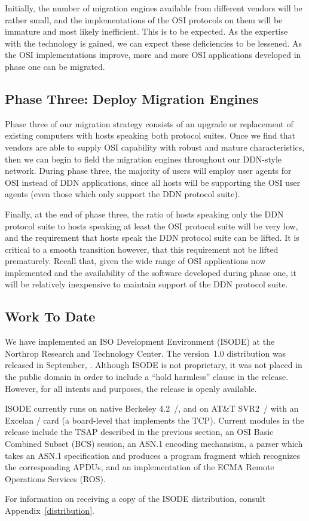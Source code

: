 Initially,
the number of migration engines available from different vendors
will be rather small, and the implementations of the OSI protocols on them
will be immature and most likely inefficient.
This is to be expected.
As the expertise with the technology is gained,
we can expect these deficiencies to be lessened.
As the OSI implementations improve,
more and more OSI applications developed in phase one can be migrated.

\subsection	{Phase Three: Deploy Migration Engines}
Phase three of our migration strategy consists of an upgrade or replacement
of existing computers with hosts speaking both protocol suites.
Once we find that vendors are able to supply OSI capability with robust and
mature characteristics,
then we can begin to field the migration engines throughout our DDN-style
network.
During phase three,
the majority of users will employ user agents for OSI instead of DDN
applications,
since all hosts will be supporting the OSI user agents
(even those which only support the DDN protocol suite).

Finally,
at the end of phase three,
the ratio of hosts speaking only the DDN protocol suite to hosts speaking at
least the OSI protocol suite will be very low,
and the requirement that hosts speak the DDN protocol suite can be lifted.
It is critical to a smooth transition however,
that this requirement not be lifted prematurely.
Recall that,
given the wide range of OSI applications now implemented
and the availability of the software developed during phase one,
it will be relatively inexpensive to maintain support of the DDN protocol
suite.

\subsection	{Work To Date}
We have implemented an ISO Development Environment (ISODE) at the Northrop
Research and Technology Center.
The version~1.0 distribution was released in September, {}.
Although ISODE is not proprietary,
it was not placed in the public domain in order to include a ``hold
harmless'' clause in the release.
However, for all intents and purposes, the release is openly available.

ISODE currently runs on native Berkeley 4.2~\unix/,
and on AT\&T SVR2~\unix/ with an Excelan \exos/ card
(a board-level that implements the TCP).
Current modules in the release include the TSAP described in the previous
section, an OSI Basic Combined Subset (BCS) session,
an ASN.1 encoding mechansism,
a parser which takes an ASN.1 specification and produces a program fragment
which recognizes the corresponding APDUs,
and an implementation of the ECMA Remote Operations Services
(ROS)\cite{ECMA.ROS}.

For information on receiving a copy of the ISODE distribution,
consult Appendix~\ref{distribution}.
